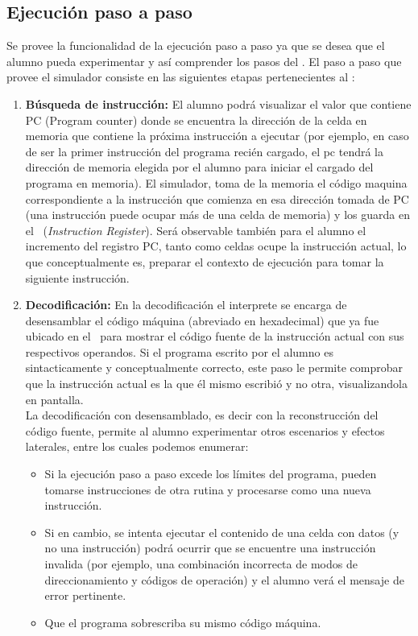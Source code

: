 \subsection{Ejecución paso a paso}

Se provee la funcionalidad de la ejecución paso a paso ya que se desea que el alumno pueda experimentar y así comprender los pasos del \ciclo. El paso a paso que provee el simulador consiste en las siguientes etapas pertenecientes al \ciclo:

\begin{enumerate}
\item \textbf{Búsqueda de instrucción:} El alumno podrá visualizar el valor que contiene PC (Program counter) donde se encuentra la dirección de la celda en memoria que contiene la próxima instrucción a ejecutar (por ejemplo, en caso de ser la primer instrucción del programa recién cargado, el pc tendrá la dirección de memoria elegida por el alumno para iniciar el cargado del programa en memoria). El simulador, toma de la memoria el código maquina correspondiente a la instrucción que comienza en esa dirección tomada de PC (una instrucción puede ocupar más de una celda de memoria) y los guarda en el \IR\ (\textit{Instruction Register}). Será observable también para el alumno el incremento del registro PC, tanto como celdas ocupe la instrucción actual, lo que conceptualmente es, preparar el contexto de ejecución para tomar la siguiente instrucción.

\item  \textbf{Decodificación:}
En la decodificación el interprete se encarga de desensamblar el código máquina (abreviado en hexadecimal) que ya fue ubicado en el \IR\ para mostrar el código fuente de la instrucción actual con sus respectivos operandos. Si el programa escrito por el alumno es sintacticamente y conceptualmente correcto, este paso le permite comprobar que la instrucción actual es la que él mismo escribió y no otra, visualizandola en pantalla. \\

La decodificación con desensamblado, es decir con la reconstrucción del código fuente, permite al alumno experimentar otros escenarios y efectos laterales, entre los cuales podemos enumerar:

\begin{itemize}
\item Si la ejecución paso a paso excede los límites del programa, pueden tomarse instrucciones de otra rutina y procesarse como una nueva instrucción.
\item Si en cambio, se intenta ejecutar el contenido de una celda con datos (y no una instrucción) podrá ocurrir que se encuentre una instrucción invalida (por ejemplo, una combinación incorrecta de modos de direccionamiento y códigos de operación) y el alumno verá el mensaje de error pertinente.
\item Que el programa sobrescriba su mismo código máquina.
\end{itemize}


\end{enumerate}
